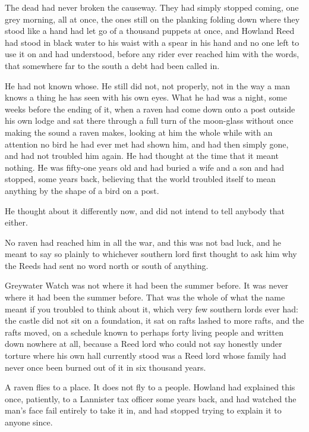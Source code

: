 The dead had never broken the causeway. They had simply stopped coming, one grey morning, all at once, the ones still on the planking folding down where they stood like a hand had let go of a thousand puppets at once, and Howland Reed had stood in black water to his waist with a spear in his hand and no one left to use it on and had understood, before any rider ever reached him with the words, that somewhere far to the south a debt had been called in.

He had not known whose. He still did not, not properly, not in the way a man knows a thing he has seen with his own eyes. What he had was a night, some weeks before the ending of it, when a raven had come down onto a post outside his own lodge and sat there through a full turn of the moon-glass without once making the sound a raven makes, looking at him the whole while with an attention no bird he had ever met had shown him, and had then simply gone, and had not troubled him again. He had thought at the time that it meant nothing. He was fifty-one years old and had buried a wife and a son and had stopped, some years back, believing that the world troubled itself to mean anything by the shape of a bird on a post.

He thought about it differently now, and did not intend to tell anybody that either.

\sceneBreak

No raven had reached him in all the war, and this was not bad luck, and he meant to say so plainly to whichever southern lord first thought to ask him why the Reeds had sent no word north or south of anything.

Greywater Watch was not where it had been the summer before. It was never where it had been the summer before. That was the whole of what the name meant if you troubled to think about it, which very few southern lords ever had: the castle did not sit on a foundation, it sat on rafts lashed to more rafts, and the rafts moved, on a schedule known to perhaps forty living people and written down nowhere at all, because a Reed lord who could not say honestly under torture where his own hall currently stood was a Reed lord whose family had never once been burned out of it in six thousand years.

A raven flies to a place. It does not fly to a people. Howland had explained this once, patiently, to a Lannister tax officer some years back, and had watched the man’s face fail entirely to take it in, and had stopped trying to explain it to anyone since.

